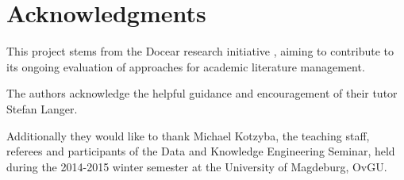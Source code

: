\documentclass{llncs}
\begin{document}
\section{Acknowledgments}
This project stems from the Docear research initiative \cite{Beel:2011:DAL:1998076.1998188}, aiming to contribute to its ongoing evaluation of approaches for academic literature management.

The authors acknowledge the helpful guidance and encouragement of their tutor Stefan Langer. 

Additionally they would like to thank Michael Kotzyba, the teaching staff, referees and participants of the Data and Knowledge Engineering Seminar, held during the 2014-2015 winter semester at the University of Magdeburg, OvGU.  

%
%





%
%
%
\end{document}
